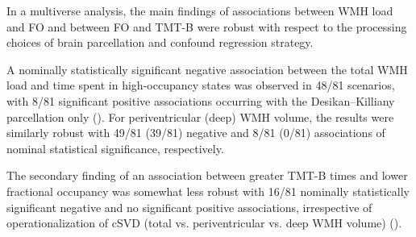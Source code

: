 In a multiverse analysis, the main findings of associations between WMH load and FO and between FO and TMT-B were robust with respect to the processing choices of brain parcellation and confound regression strategy.

A nominally statistically significant negative association between the total WMH load and time spent in high-occupancy states was observed in 48/81 scenarios, with 8/81 significant positive associations occurring with the Desikan--Killiany parcellation only (). 
For periventricular (deep) WMH volume, the results were similarly robust with 49/81 (39/81) negative and 8/81 (0/81) associations of nominal statistical significance, respectively.

The secondary finding of an association between greater TMT-B times and lower fractional occupancy was somewhat less robust with 16/81 nominally statistically significant negative and no significant positive associations, irrespective of operationalization of cSVD (total vs. periventricular vs. deep WMH volume) ().

